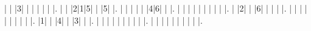 \begin{sudoku-block}
| | |3| | | | | | |.
| | |2|1|5| | |5| |.
| | | | | |4|6| | |.
| | | | | | | | | |.
| |2| | |6| | | | |.
| | | | | | | | | |.
|1| | |4| | |3| | |.
| | | | | | | | | |.
| | | | | | | | | |.
\end{sudoku-block}